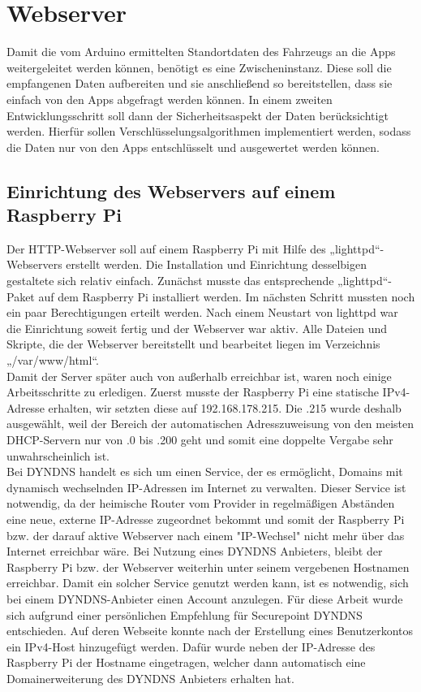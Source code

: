 \section{Webserver}

Damit die vom Arduino ermittelten Standortdaten des Fahrzeugs an die Apps weitergeleitet werden können, benötigt es eine Zwischeninstanz. Diese soll die empfangenen Daten aufbereiten und sie anschließend so bereitstellen, dass sie einfach von den Apps abgefragt werden können.
In einem zweiten Entwicklungsschritt soll dann der Sicherheitsaspekt der Daten berücksichtigt werden. Hierfür sollen Verschlüsselungsalgorithmen implementiert werden, sodass die Daten nur von den Apps entschlüsselt und ausgewertet werden können.

\subsection{Einrichtung des Webservers auf einem Raspberry Pi}
Der HTTP-Webserver soll auf einem Raspberry Pi mit Hilfe des „lighttpd“-Webservers erstellt werden. Die Installation und Einrichtung desselbigen gestaltete sich relativ einfach. Zunächst musste das entsprechende „lighttpd“-Paket auf dem Raspberry Pi installiert werden. Im nächsten Schritt mussten noch ein paar Berechtigungen erteilt werden. Nach einem Neustart von lighttpd war die Einrichtung soweit fertig und der Webserver war aktiv. Alle Dateien und Skripte, die der Webserver bereitstellt und bearbeitet liegen im Verzeichnis „/var/www/html“.
\\
Damit der Server später auch von außerhalb erreichbar ist, waren noch einige Arbeitsschritte zu erledigen. Zuerst musste der Raspberry Pi eine statische IPv4-Adresse erhalten, wir setzten diese auf 192.168.178.215. Die .215 wurde deshalb ausgewählt, weil der Bereich der automatischen Adresszuweisung von den meisten DHCP-Servern nur von .0 bis .200 geht und somit eine doppelte Vergabe sehr unwahrscheinlich ist.
\\
Bei DYNDNS handelt es sich um einen Service, der es ermöglicht, Domains mit dynamisch wechselnden IP-Adressen im Internet zu verwalten. Dieser Service ist notwendig, da der heimische Router vom Provider in regelmäßigen Abständen eine neue, externe IP-Adresse zugeordnet bekommt und somit der Raspberry Pi bzw. der darauf aktive Webserver nach einem "IP-Wechsel" nicht mehr über das Internet erreichbar wäre. Bei Nutzung eines DYNDNS Anbieters, bleibt der Raspberry Pi bzw. der Webserver weiterhin unter seinem vergebenen Hostnamen erreichbar. Damit ein solcher Service genutzt werden kann, ist es notwendig, sich bei einem DYNDNS-Anbieter einen Account anzulegen. Für diese Arbeit wurde sich aufgrund einer persönlichen Empfehlung für Securepoint DYNDNS entschieden. Auf deren Webseite konnte nach der Erstellung eines Benutzerkontos ein IPv4-Host hinzugefügt werden. Dafür wurde neben der IP-Adresse des Raspberry Pi der Hostname eingetragen, welcher dann automatisch eine Domainerweiterung des DYNDNS Anbieters erhalten hat.
